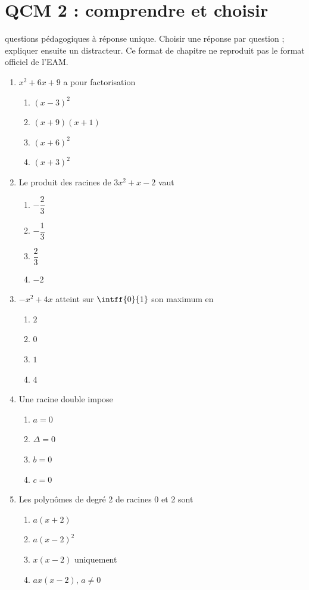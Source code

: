 \endgroup
\begingroup\small
{}\section*{QCM 2 : comprendre et choisir}\label{C02-Q2}
 questions pédagogiques à réponse unique. Choisir une réponse par question ; expliquer ensuite un distracteur. Ce format de chapitre ne reproduit pas le format officiel de l’EAM.
\begin{enumerate}
\item $x^2+6x+9$ a pour factorisation
\begin{enumerate}[label=\Alph*.,itemsep=2pt]
\item $(x-3)^2$
\item $(x+9)(x+1)$
\item $(x+6)^2$
\item $(x+3)^2$
\end{enumerate}
\item Le produit des racines de $3x^2+x-2$ vaut
\begin{enumerate}[label=\Alph*.,itemsep=2pt]
\item $-\dfrac{2}{3}$
\item $-\dfrac{1}{3}$
\item $\dfrac{2}{3}$
\item $-2$
\end{enumerate}
\item $-x^2+4x$ atteint sur $\intff{0}{1}$ son maximum en
\begin{enumerate}[label=\Alph*.,itemsep=2pt]
\item $2$
\item $0$
\item $1$
\item $4$
\end{enumerate}
\item Une racine double impose
\begin{enumerate}[label=\Alph*.,itemsep=2pt]
\item $a=0$
\item $\Delta=0$
\item $b=0$
\item $c=0$
\end{enumerate}
\item Les polynômes de degré 2 de racines 0 et 2 sont
\begin{enumerate}[label=\Alph*.,itemsep=2pt]
\item $a(x+2)$
\item $a(x-2)^2$
\item $x(x-2)$ uniquement
\item $ax(x-2)$, $a\ne0$
\end{enumerate}
\end{enumerate}
